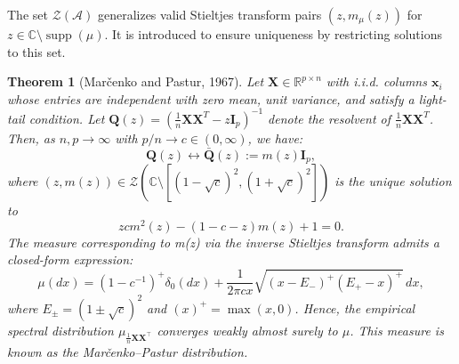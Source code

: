 \documentclass[12pt]{article}
\newtheorem{theorem}{Theorem}
\begin{document}
The set $\mathcal{Z}(\mathcal{A})$ generalizes valid Stieltjes transform pairs $(z, m_\mu(z))$ for $z \in \mathbb{C} \setminus \operatorname{supp}(\mu)$. It is introduced to ensure uniqueness by restricting solutions to this set.

\begin{theorem}[Mar\v{c}enko and Pastur, 1967]\label{thm:marcenko-pastur}
Let $\mathbf{X} \in \mathbb{R}^{p \times n}$ with i.i.d. columns $\mathbf{x}_i$ whose entries are independent with zero mean, unit variance, and satisfy a light-tail condition. Let $\mathbf{Q}(z) = \left(\frac{1}{n} \mathbf{X}\mathbf{X}^T - z\mathbf{I}_p\right)^{-1}$ denote the resolvent of $\frac{1}{n} \mathbf{X}\mathbf{X}^T$. Then, as $n, p \to \infty$ with $p/n \to c \in (0, \infty)$, we have:
$$
\mathbf{Q}(z) \leftrightarrow \bar{\mathbf{Q}}(z) := m(z) \mathbf{I}_p,
$$
where $(z, m(z)) \in \mathcal{Z}(\mathbb{C} \setminus [(1-\sqrt{c})^2, (1+\sqrt{c})^2])$ is the unique solution to
$$
z c m^2(z) - (1 - c - z) m(z) + 1 = 0.
$$
The measure corresponding to m(z) via the inverse Stieltjes transform admits a closed-form expression:
$$
\mu(dx) = (1 - c^{-1})^+ \delta_0(dx) + \frac{1}{2 \pi c x} \sqrt{(x - E_-)^+ (E_+ - x)^+} \, dx,
$$
where $E_\pm = (1 \pm \sqrt{c})^2$ and $(x)^+ = \max(x, 0)$. Hence, the empirical spectral distribution $\mu_{\frac{1}{n} \mathbf{X} \mathbf{X}^\top}$ converges weakly almost surely to $\mu$. This measure is known as the Mar\v{c}enko--Pastur distribution.
\end{theorem}
\end{document}
